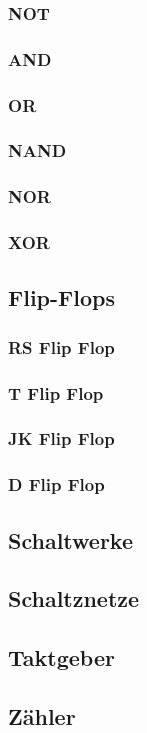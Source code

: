 \documentclass[12pt,a4paper]{article}
\begin{document}
\subsubsection{NOT}%
\subsubsection{AND}
\subsubsection{OR}
\subsubsection{NAND}
\subsubsection{NOR}
\subsubsection{XOR}
\subsection{Flip-Flops}
\subsubsection{RS Flip Flop}
\subsubsection{T Flip Flop}
\subsubsection{JK Flip Flop}
\subsubsection{D Flip Flop}
\subsection{Schaltwerke}
\subsection{Schaltznetze}
\subsection{Taktgeber}
\subsection{Zähler}
\end{document}
